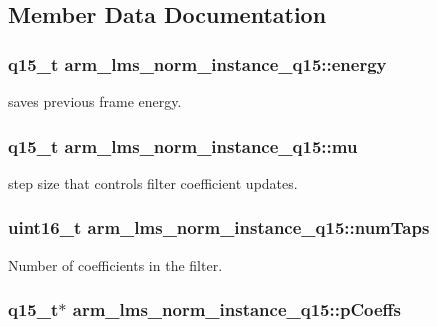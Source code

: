 \subsection{Member Data Documentation}
\hypertarget{structarm__lms__norm__instance__q15_a1c81ded399919d8181026bc1c8602e7b}{
\subsubsection[{energy}]{\setlength{\rightskip}{0pt plus 5cm}q15\-\_\-t arm\-\_\-lms\-\_\-norm\-\_\-instance\-\_\-q15\-::energy}}\label{structarm__lms__norm__instance__q15_a1c81ded399919d8181026bc1c8602e7b}
saves previous frame energy. \hypertarget{structarm__lms__norm__instance__q15_a7ce00f21d11cfda6d963240641deea8c}{
\subsubsection[{mu}]{\setlength{\rightskip}{0pt plus 5cm}q15\-\_\-t arm\-\_\-lms\-\_\-norm\-\_\-instance\-\_\-q15\-::mu}}\label{structarm__lms__norm__instance__q15_a7ce00f21d11cfda6d963240641deea8c}
step size that controls filter coefficient updates. \hypertarget{structarm__lms__norm__instance__q15_a9ee7a45f4f315d7996a969e25fdc7146}{
\subsubsection[{num\-Taps}]{\setlength{\rightskip}{0pt plus 5cm}uint16\-\_\-t arm\-\_\-lms\-\_\-norm\-\_\-instance\-\_\-q15\-::num\-Taps}}\label{structarm__lms__norm__instance__q15_a9ee7a45f4f315d7996a969e25fdc7146}
Number of coefficients in the filter. \hypertarget{structarm__lms__norm__instance__q15_ae7bca648c75a2ffa02d87852bb78bc8a}{
\subsubsection[{p\-Coeffs}]{\setlength{\rightskip}{0pt plus 5cm}q15\-\_\-t$\ast$ arm\-\_\-lms\-\_\-norm\-\_\-instance\-\_\-q15\-::p\-Coeffs}}\label{structarm__lms__norm__instance__q15_ae7bca648c75a2ffa02d87852bb78bc8a}
